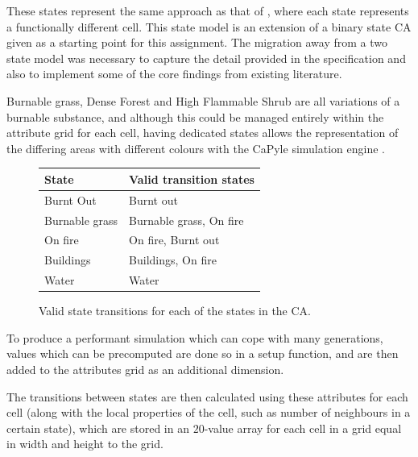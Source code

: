 \documentclass[11pt, a4paper, titlepage]{article}
\begin{document}
These states represent the same approach as that of \cite{ALEXANDRIDIS2008191}, where each state represents a functionally different cell. This state model is an extension of a binary state CA given as a starting point for this assignment. The migration away from a two state model was necessary to capture the detail provided in the specification and also to implement some of the core findings from existing literature.

Burnable grass, Dense Forest and High Flammable Shrub are all variations of a burnable substance, and although this could be managed entirely within the attribute grid for each cell, having dedicated states allows the representation of the differing areas with different colours with the CaPyle simulation engine \cite{capyle_home_2016}. 

\begin{figure}[h]
  \centering
    \begin{tabular}{ || l | l ||}
      \hline
      \textbf{State}            &  \textbf{Valid transition states}  \\ 
      \hline
      Burnt Out        &  Burnt out           \\       
      Burnable grass         &  Burnable grass, On fire   \\
      On fire          &  On fire, Burnt out  \\   
      Buildings          &  Buildings, On fire  \\   
      Water     &  Water        \\
      \hline
 
    \end{tabular}
  \caption{Valid state transitions for each of the states in the CA.}
  \label{Valid state transitions}
\end{figure}

To produce a performant simulation which can cope with many generations, values which can be precomputed are done so in a setup function, and are then added to the attributes grid as an additional dimension.

The transitions between states are then calculated using these attributes for each cell (along with the local properties of the cell, such as number of neighbours in a certain state), which are stored in an $20$-value array for each cell in a grid equal in width and height to the grid. 
\end{document}
